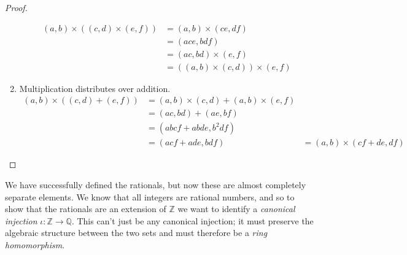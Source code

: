 \begin{proof}
\begin{enumerate}
\begin{align}
          (a, b) \times ((c, d) \times (e, f)) & = (a, b) \times (ce, df) \\ 
                                               & = (ace, bdf) \\
                                               & = (ac, bd) \times (e, f) \\
                                               & = ((a, b) \times (c, d)) \times (e, f)
        \end{align}
        \item Multiplication distributes over addition. 
          \begin{align}
            (a, b) \times ((c, d) + (e, f)) & = (a, b) \times (c, d) + (a, b) \times (e, f) \\
                                            & = (ac, bd) + (ae, bf) \\
                                            & = (abcf + abde, b^2 df) \\
                                            & = (acf + ade, bdf)  
                                            & = (a, b) \times (cf + de, df)
          \end{align}
      \end{enumerate}
    \end{proof} 

    We have successfully defined the rationals, but now these are almost completely separate elements. We know that all integers are rational numbers, and so to show that the rationals are an extension of $\mathbb{Z}$ we want to identify a \textit{canonical injection} $\iota: \mathbb{Z} \rightarrow \mathbb{Q}$. This can't just be any canonical injection; it must preserve the algebraic structure between the two sets and must therefore be a \textit{ring homomorphism}. 

